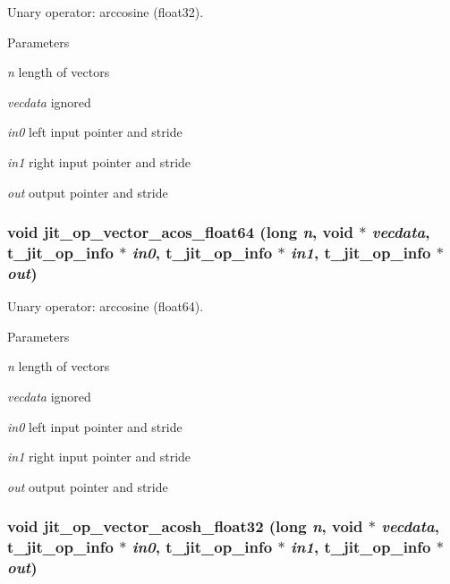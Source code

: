 Unary operator: arccosine (float32). 
\begin{DoxyParams}{Parameters}
\item[{\em n}]length of vectors \item[{\em vecdata}]ignored \item[{\em in0}]left input pointer and stride \item[{\em in1}]right input pointer and stride \item[{\em out}]output pointer and stride \end{DoxyParams}
\hypertarget{group__opvecmod_ga46d0ebc25d8e255f31926e84e358f5c5}{
\subsubsection[{jit\_\-op\_\-vector\_\-acos\_\-float64}]{\setlength{\rightskip}{0pt plus 5cm}void jit\_\-op\_\-vector\_\-acos\_\-float64 (long {\em n}, \/  void $\ast$ {\em vecdata}, \/  {\bf t\_\-jit\_\-op\_\-info} $\ast$ {\em in0}, \/  {\bf t\_\-jit\_\-op\_\-info} $\ast$ {\em in1}, \/  {\bf t\_\-jit\_\-op\_\-info} $\ast$ {\em out})}}
\label{group__opvecmod_ga46d0ebc25d8e255f31926e84e358f5c5}


Unary operator: arccosine (float64). 
\begin{DoxyParams}{Parameters}
\item[{\em n}]length of vectors \item[{\em vecdata}]ignored \item[{\em in0}]left input pointer and stride \item[{\em in1}]right input pointer and stride \item[{\em out}]output pointer and stride \end{DoxyParams}
\hypertarget{group__opvecmod_gaa737541b153a2de2a2a2a7877ce89394}{
\subsubsection[{jit\_\-op\_\-vector\_\-acosh\_\-float32}]{\setlength{\rightskip}{0pt plus 5cm}void jit\_\-op\_\-vector\_\-acosh\_\-float32 (long {\em n}, \/  void $\ast$ {\em vecdata}, \/  {\bf t\_\-jit\_\-op\_\-info} $\ast$ {\em in0}, \/  {\bf t\_\-jit\_\-op\_\-info} $\ast$ {\em in1}, \/  {\bf t\_\-jit\_\-op\_\-info} $\ast$ {\em out})}}
\label{group__opvecmod_gaa737541b153a2de2a2a2a7877ce89394}


